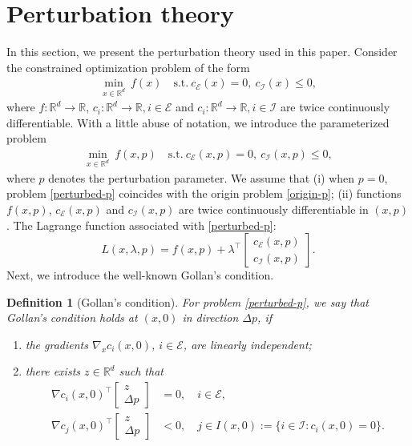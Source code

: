\documentclass[11pt]{article}
\newtheorem{definition}{Definition}
\newcommand{\R}{\mathbb{R}}
\newcommand{\be}{\begin{equation}}
\newcommand{\ee}{\end{equation}}
\begin{document}
\section{Perturbation theory}\label{sec:appendix-perturb}
\renewcommand{\thedefinition}{\thesection.\arabic{definition}}
\setcounter{definition}{0}
\setcounter{lemma}{0}
In this section, we present the perturbation theory used in this paper. Consider the constrained optimization problem of the form
\be\label{origin-p}
\begin{aligned}
    \min_{x \in \mathbb{R}^d} ~ f(x) \quad
    \text{s.t.}~ c_\mathcal{E}(x) = 0,~  c_\mathcal{I}(x) \leq 0,
\end{aligned}
\ee
where \(f:\R^d\to \R\),  \(c_i: \R^d\to \R, i\in\mathcal{E}\) and \(c_i:\R^d\to \R, i\in \mathcal{I}\) are twice continuously differentiable. With a little abuse of notation, we introduce the parameterized problem  
\be\label{perturbed-p}
\begin{aligned}
    \min_{x \in \mathbb{R}^d} ~ f(x,p) \quad
    \text{s.t.}~ c_\mathcal{E}(x,p) = 0,~  c_\mathcal{I}(x,p) \leq 0,
\end{aligned}
\ee
where \(p\) denotes the perturbation parameter. We assume that (i) when \(p = 0\), problem \eqref{perturbed-p} coincides with the origin problem \eqref{origin-p}; (ii) functions \(f(x,p)\), \(c_\mathcal{E}(x,p)\) and \(c_\mathcal{I}(x,p)\) are twice continuously differentiable in \((x,p)\). The Lagrange function associated with \eqref{perturbed-p}:
\[
L(x,\lambda,p) = f(x,p) + \lambda^\top \begin{bmatrix}
    c_\mathcal{E}(x,p) \\ c_\mathcal{I}(x,p)
\end{bmatrix}.
\]
Next, we introduce the well-known Gollan’s condition.
\begin{definition}[Gollan's condition]  For problem \eqref{perturbed-p}, 
we say that Gollan's condition holds at $(x,0)$ in direction $\Delta p$, if
\begin{enumerate}
    \item[(i)] the gradients $\nabla_x c_i(x,0)$, $i\in\mathcal E$, are linearly independent;
    \item[(ii)] there exists $z \in \mathbb{R}^d$ such that
    \begin{align*}
        \nabla c_{i}(x,0)^\top \begin{bmatrix}
            z\\
            \Delta p
        \end{bmatrix} &= 0, \quad i\in \mathcal E, \\
        \nabla c_j(x,0)^\top \begin{bmatrix}
            z\\
            \Delta p
        \end{bmatrix}  &< 0, \quad j \in I(x,0):= \{i\in\mathcal I: c_i(x,0)=0\}.%
    \end{align*}
\end{enumerate}
\end{definition}
\end{document}
